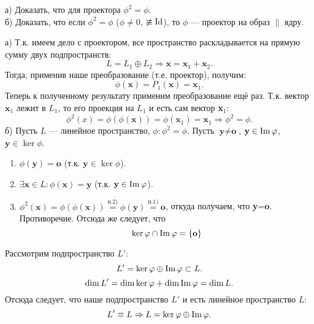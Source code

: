 \begin{prim}
	а) Доказать, что для проектора $\phi^2=\phi$.\\
	б) Доказать, что если $\phi^2=\phi$ ($\phi\neq0$, $\not\equiv\operatorname{\mathop{Id}}$), то $\phi$ --- проектор на образ $\parallel$ ядру.
\end{prim}
а) Т.к. имеем дело с проектором, все пространство раскладывается на прямую сумму двух подпространств:
$$
L=L_1\oplus L_2\Rightarrow \textbf{x}=\textbf{x$_1$}+\textbf{x$_2$}.
$$
Тогда, применив наше преобразование (т.е. проектор), получим:
$$
\phi(\textbf{x})=P_1(\textbf{x})=\textbf{x$_1$}.
$$
Теперь к полученному результату применим преобразование ещё раз. Т.к. вектор $\textbf{x$_1$}$ лежит в $L_1$, то его проекция на $L_1$ и есть сам вектор \textbf{x$_1$}:
$$
\phi^2(x)=\phi(\phi(\textbf{x}))=\phi(\textbf{x$_1$})=\textbf{x$_1$} \Rightarrow \boxed{\phi^2=\phi}.
$$
б) Пусть $L$ --- линейное пространство, $\phi: \phi^2=\phi$. Пусть $\textbf{y}\neq \textbf{o}$, $\textbf{y} \in \operatorname{\mathop{Im}}\varphi$, $\textbf{y}\in\ker\phi$.
\begin{enumerate}
	\item $\phi(\textbf{y}) = \textbf{o}$ (т.к. $\textbf{y}\in\ker\phi$).
	\item $\exists \textbf{x}\in L: \phi(\textbf{x}) = \textbf{y}$ (т.к. $\textbf{y}\in\operatorname{\mathop{Im}}\varphi$).
	\item $\phi^2(\textbf{x})=\phi(\phi(\textbf{x}))\overset{\text{п.2)}}=\phi(\textbf{y})\overset{\text{п.1)}}{=}\textbf{o}$, откуда получаем, что \textbf{y}=\textbf{o}. Противоречие. Отсюда же следует, что
	$$
	\ker\varphi\cap\operatorname{\mathop{Im}}\varphi=\{\textbf{o}\}
	$$
\end{enumerate}
Рассмотрим подпространство $L'$:
$$
L'=\ker\varphi\oplus\operatorname{\mathop{Im}}\varphi\subset L.
$$
$$
\dim L'=\dim\ker\varphi+\dim\operatorname{\mathop{Im}}\varphi=\dim L.
$$
Отсюда следует, что наше подпространство $L'$ и есть линейное пространство $L$:
$$
L'\equiv L \Rightarrow L=\ker\varphi\oplus\operatorname{\mathop{Im}}\varphi.
$$
